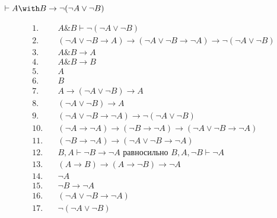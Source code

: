 \begin{exercise}[4.b]
    \(\vdash A \with B \to \neg (\neg A \lor \neg B)\)

    \begin{align*}
        1.\quad  & A\&B \vdash \neg (\neg A  \lor \neg B) \tag{т. о дедукции}                                                    \\
        2.\quad  & (\neg A  \lor \neg B \to A) \to (\neg A  \lor \neg B  \to \neg A) \to  \neg (\neg A  \lor \neg B) \tag{акс.9} \\
        3.\quad  & A\&B \to A \tag{акс. 4}                                                                                       \\
        4.\quad  & A\&B \to B \tag{акс. 5}                                                                                       \\
        5.\quad  & A \tag{M.P. 3, 1}                                                                                             \\
        6.\quad  & B \tag{M.P. 4, 1}                                                                                             \\
        7.\quad  & A \to (\neg A  \lor \neg B) \to A \tag{акс.1}                                                                 \\
        8.\quad  & (\neg A  \lor \neg B) \to A \tag{M.P. 7, 5}                                                                   \\
        9.\quad  & (\neg A  \lor \neg B  \to \neg A) \to  \neg (\neg A  \lor \neg B) \tag{M.P. 2, 8}                             \\
        10.\quad & (\neg A \to \neg A) \to (\neg B \to \neg A) \to (\neg A  \lor \neg B \to \neg A) \tag{акс. 8}                 \\
        11.\quad & (\neg B \to \neg A) \to (\neg A  \lor \neg B \to \neg A) \tag{M.P. 8 и известный факт}                        \\
        12.\quad & B, A \vdash \neg B \to \neg A \text{ равносильно } B, A, \neg B \vdash \neg A \tag{т. о дедукции}             \\
        13.\quad & (A \to B) \to (A \to \neg B) \to \neg A \tag{акс.9}                                                           \\
        14.\quad & \neg A \tag{дважды аксиома 1 из \(B\) и \(\neg B\)}                                                           \\
        15.\quad & \neg B \to \neg A \tag{доказали по дедукции}                                                                  \\
        16.\quad & (\neg A  \lor \neg B \to \neg A) \tag{M.P. 11, 15}                                                            \\
        17.\quad & \neg (\neg A  \lor \neg B) \tag{M.P. 9, 16}
    \end{align*}

\end{exercise}

